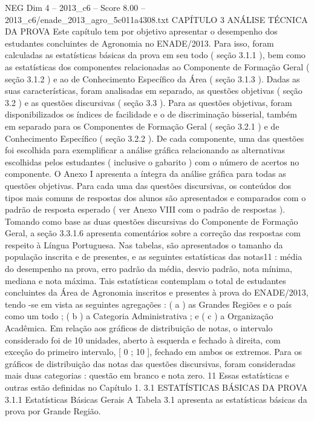 \begin{textsample}{NEG Dim 4 – 2013\_c6 – Score 8.00 – 2013\_c6/enade\_2013\_agro\_5c011a4308.txt}  \label{ex:f4_neg_312}
CAPÍTULO 3 ANÁLISE TÉCNICA DA PROVA Este capítulo tem por objetivo apresentar o desempenho dos estudantes concluintes de Agronomia no ENADE/2013.
Para isso, foram calculadas as estatísticas básicas da prova em seu todo ( seção 3.1.1 ), bem como as estatísticas dos componentes relacionadas ao Componente de Formação Geral ( seção 3.1.2 ) e ao de Conhecimento Específico da Área ( seção 3.1.3 ).
Dadas as suas características, foram analisadas em separado, as questões objetivas ( seção 3.2 ) e as questões discursivas ( seção 3.3 ).
Para as questões objetivas, foram disponibilizados os índices de facilidade e o de discriminação bisserial, também em separado para os Componentes de Formação Geral ( seção 3.2.1 ) e de Conhecimento Específico ( seção 3.2.2 ).
De cada componente, uma das questões foi escolhida para exemplificar a análise gráfica relacionando as alternativas escolhidas pelos estudantes ( inclusive o gabarito ) com o número de acertos no componente.
O Anexo I apresenta a íntegra da análise gráfica para todas as questões objetivas.
Para cada uma das questões discursivas, os conteúdos dos tipos mais comuns de respostas dos alunos são apresentados e comparados com o padrão de resposta esperado ( ver Anexo VIII com o padrão de respostas ).
Tomando como base as duas questões discursivas do Componente de Formação Geral, a seção 3.3.1.6 apresenta comentários sobre a correção das respostas com respeito à Língua Portuguesa.
Nas tabelas, são apresentados o tamanho da população inscrita e de presentes, e as seguintes estatísticas das notas11 : média do desempenho na prova, erro padrão da média, desvio padrão, nota mínima, mediana e nota máxima.
Tais estatísticas contemplam o total de estudantes concluintes da Área de Agronomia inscritos e presentes à prova do ENADE/2013, tendo -se em vista as seguintes agregações : ( a ) as Grandes Regiões e o país como um todo ; ( b ) a Categoria Administrativa ; e ( c ) a Organização Acadêmica.
Em relação aos gráficos de distribuição de notas, o intervalo considerado foi de 10 unidades, aberto à esquerda e fechado à direita, com exceção do primeiro intervalo, [ 0 ; 10 ], fechado em ambos os extremos.
Para os gráficos de distribuição das notas das questões discursivas, foram consideradas mais duas categorias : questão em branco e nota zero. 11 Essas estatísticas e outras estão definidas no Capítulo 1. 3.1 ESTATÍSTICAS BÁSICAS DA PROVA 3.1.1 Estatísticas Básicas Gerais A Tabela 3.1 apresenta as estatísticas básicas da prova por Grande Região.

\end{textsample}
